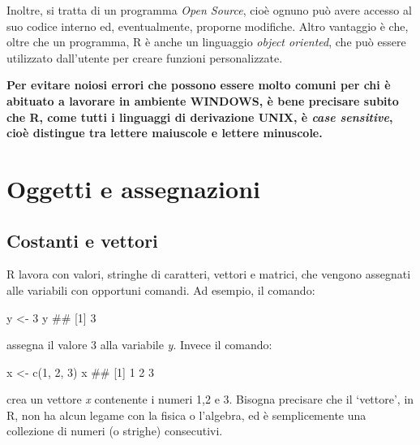 \documentclass[a4paper,12pt,oneside]{book}
\newenvironment{Shaded}{}{}
\newcommand{\KeywordTok}[1]{#1}
\newcommand{\DecValTok}[1]{#1}
\newcommand{\StringTok}[1]{#1}
\newcommand{\CommentTok}[1]{#1}
\newcommand{\NormalTok}[1]{#1}
\begin{document}
Inoltre, si tratta di un programma \emph{Open Source}, cioè ognuno può avere accesso al suo codice interno ed, eventualmente, proporne modifiche. Altro vantaggio è che, oltre che un programma, R è anche un linguaggio \emph{object oriented}, che può essere utilizzato dall'utente per creare funzioni personalizzate.

\textbf{Per evitare noiosi errori che possono essere molto comuni per chi è abituato a lavorare in ambiente WINDOWS, è bene precisare subito che R, come tutti i linguaggi di derivazione UNIX, è \emph{case sensitive}, cioè distingue tra lettere maiuscole e lettere minuscole.}

\hypertarget{oggetti-e-assegnazioni}{%
\section*{Oggetti e assegnazioni}\label{oggetti-e-assegnazioni}}

\hypertarget{costanti-e-vettori}{%
\subsection*{Costanti e vettori}\label{costanti-e-vettori}}

R lavora con valori, stringhe di caratteri, vettori e matrici, che vengono assegnati alle variabili con opportuni comandi. Ad esempio, il comando:

\begin{Shaded}
\begin{Highlighting}[]
\NormalTok{y  <-}\StringTok{  }\DecValTok{3}
\NormalTok{y}
\CommentTok{## [1] 3}
\end{Highlighting}
\end{Shaded}

assegna il valore 3 alla variabile \emph{y}. Invece il comando:

\begin{Shaded}
\begin{Highlighting}[]
\NormalTok{x  <-}\StringTok{  }\KeywordTok{c}\NormalTok{(}\DecValTok{1}\NormalTok{, }\DecValTok{2}\NormalTok{, }\DecValTok{3}\NormalTok{)}
\NormalTok{x}
\CommentTok{## [1] 1 2 3}
\end{Highlighting}
\end{Shaded}

crea un vettore \emph{x} contenente i numeri 1,2 e 3. Bisogna precisare che il `vettore', in R, non ha alcun legame con la fisica o l'algebra, ed è semplicemente una collezione di numeri (o strighe) consecutivi.
\end{document}
